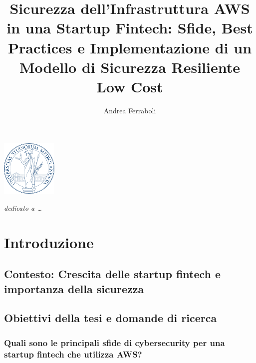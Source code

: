 \documentclass[a4paper,12pt]{report}
\begin{document}
\begin{center}
        \includegraphics[width=0.2\textwidth]{images/Unimi-logo.png}
        \vspace{1cm}
\end{center}

\title{Sicurezza dell'Infrastruttura AWS in una Startup Fintech: Sfide, Best Practices e Implementazione di un Modello di Sicurezza Resiliente Low Cost}
\author{Andrea Ferraboli}
%
% 
%
\beforepreface
\prefacesection{}
        {\hfill \Large {\sl dedicato a \dots}}
% 
%

\tableofcontents

\chapter*{Introduzione}
\section{Contesto: Crescita delle startup fintech e importanza della sicurezza}
\section{Obiettivi della tesi e domande di ricerca}
\subsection{Quali sono le principali sfide di cybersecurity per una startup fintech che utilizza AWS?}
\end{document}
